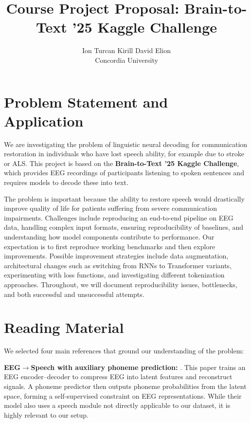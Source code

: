 \documentclass[10pt,twocolumn,letterpaper]{article}
\title{Course Project Proposal: Brain-to-Text '25 Kaggle Challenge}
\author{
Ion Turcan \quad Kirill \quad David \quad Elion\\
Concordia University
}
\begin{document}
\maketitle
\thispagestyle{empty}


\section{Problem Statement and Application}
We are investigating the problem of linguistic neural decoding for communication restoration in individuals who have lost speech ability, for example due to stroke or ALS.  
This project is based on the \textbf{Brain-to-Text '25 Kaggle Challenge}, which provides EEG recordings of participants listening to spoken sentences and requires models to decode these into text.  

The problem is important because the ability to restore speech would drastically improve quality of life for patients suffering from severe communication impairments.  
Challenges include reproducing an end-to-end pipeline on EEG data, handling complex input formats, ensuring reproducibility of baselines, and understanding how model components contribute to performance.  
Our expectation is to first reproduce working benchmarks and then explore improvements.  
Possible improvement strategies include data augmentation, architectural changes such as switching from RNNs to Transformer variants, experimenting with loss functions, and investigating different tokenization approaches.  
Throughout, we will document reproducibility issues, bottlenecks, and both successful and unsuccessful attempts.  

\section{Reading Material}
We selected four main references that ground our understanding of the problem:  

\textbf{EEG$\to$Speech with auxiliary phoneme prediction:} \cite{lee_enhancing_2025}.  
This paper trains an EEG encoder--decoder to compress EEG into latent features and reconstruct signals.  
A phoneme predictor then outputs phoneme probabilities from the latent space, forming a self-supervised constraint on EEG representations.  
While their model also uses a speech module not directly applicable to our dataset, it is highly relevant to our setup.  
\end{document}
